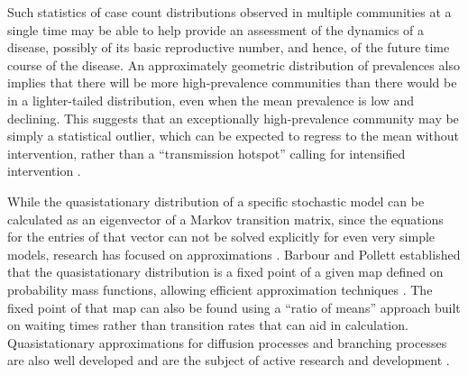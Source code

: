 \documentclass[review]{elsarticle}
\begin{document}
Such statistics of case count distributions
observed in multiple communities at a single time
may be able to help provide an assessment of the dynamics
of a disease, possibly of its basic reproductive number,
and hence, of the future time course of the disease.
An approximately geometric distribution of prevalences also implies
that there will be more high-prevalence communities than there would be
in a lighter-tailed distribution,
even when the mean prevalence is low and declining.
This suggests that an exceptionally high-prevalence community may be
simply a statistical outlier, which can be expected to regress to the
mean without intervention, rather than a ``transmission hotspot''
calling for intensified intervention \cite{lietman-gebre-abdou2015}.

While the quasistationary distribution of a specific stochastic model
can be calculated as an eigenvector of a Markov transition matrix,
since the equations for the entries of that vector
can not be solved explicitly for even very simple models,
research has focused on approximations
\cite[for example]{cavender_quasi-stationary_1978,kryscio_extinction_1989,nasell_quasi-stationary_1996,naasell2003moment}.
Barbour and Pollett \cite{barbour2010total} established that the
quasistationary distribution is a fixed point of a given map defined
on probability mass functions, allowing efficient approximation techniques
\cite{van2013quasi}. The fixed point of that map can also be
found using a ``ratio of means'' approach built on waiting times rather than
transition rates \cite{artalejo_quasi-stationary_2010}
that can aid in calculation.
Quasistationary approximations for diffusion processes
and branching processes are also well developed and
are the subject of active research and development
\cite{van2013quasi,lambert2008population,meleard2012quasi}.
\end{document}

